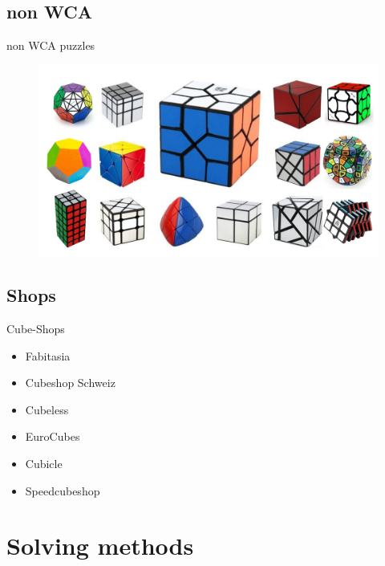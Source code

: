 \documentclass[10pt]{beamer}
\begin{document}
        \subsection{non WCA}
            \begin{frame}{non WCA puzzles}
                \begin{figure}
                    \includegraphics[width=\textwidth]{assets/nonWCAall.jpg}
                \end{figure}
            \end{frame}
        \subsection{Shops}
            \begin{frame}{Cube-Shops}
                \begin{itemize}
                    \item Fabitasia
                    \item Cubeshop Schweiz
                    \item Cubeless
                    \item EuroCubes
                    \item Cubicle
                    \item Speedcubeshop
                \end{itemize}
            \end{frame}
        
    \section{Solving methods}
\end{document}

